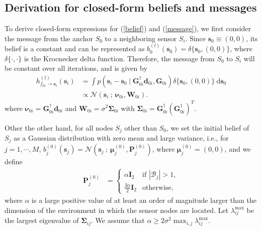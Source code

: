 \documentclass[10pt, twocolumn, final]{IEEEtran}
\newcommand{\bP}{\mathbf{P}}
\newcommand{\bW}{\mathbf{W}}
\newcommand{\bSigma}{\mathbf{\Sigma}}
\newcommand{\N}[2]{{\mathcal{N}\left(#1\ ;\ #2\right)}}
\newcommand{\tc}[1]{^{(#1)}}
\begin{document}
\subsection{Derivation for closed-form beliefs and messages}\label{Subsection:Derivation}
To derive closed-form expressions for (\ref{belief}) and (\ref{message}), we first consider the message from the anchor $S_0$ to a neighboring sensor $S_i$. Since $\mathbf{s}_0 \equiv (0, 0)$, its belief is a constant and can be represented as $b_0^{(l)}(\mathbf{s}_0) = \delta\{\mathbf{s}_0, (0, 0)\}$, where $\delta\{\cdot, \cdot\}$ is the Krocnecker delta function. Therefore, the message from $S_0$ to $S_i$ will be constant over all iterations, and is given by
\begin{align}
h_{f_{0i} \rightarrow \mathbf{s}_i}^{(l)}(\mathbf{s}_i) & = \int p(\mathbf{s}_i - \mathbf{s}_0 \mid \mathbf{G}_{0i}^{\dagger}\mathbf{d}_{0i}, \mathbf{G}_{0i}) \delta\{\mathbf{s}_0, (0,0)\} \ \mathrm{d} \mathbf{s}_0 \nonumber \\
& \propto \N{\mathbf{s}_i}{\bm{\nu}_{0i},\bW_{0i}}. \label{S0Si}
\end{align}
where $\bm{\nu}_{0i} = \mathbf{G}_{0i}^{\dagger}\mathbf{d}_{0i}$ and $\bW_{0i} = \sigma^2\bSigma_{0i}$ with $\bSigma_{0i} = \mathbf{G}_{0i}^{\dagger} (\mathbf{G}_{0i}^{\dagger})^T$.

Other the other hand, for all nodes $S_j$ other than $S_0$, we set the initial belief of $S_j$ as a Gaussian distribution with zero mean and large variance, i.e., for $j = 1, \cdots, M$, $b_j^{(0)}(\mathbf{s}_j) = \N{\mathbf{s}_j}{\bm{\mu}_j\tc{0}, \bP_j\tc{0}}$, where $\bm{\mu}_j\tc{0} = (0,0)$, and we define
\begin{align*}
\bP_j\tc{0} & = \left\{
\begin{array}{rl}
\alpha \mathbf{I}_2 & \text{if } |\mathcal{B}_j| > 1, \\
\frac{3\alpha}{2}\mathbf{I}_2 & \text{otherwise,}
\end{array}
\right.
\end{align*}
where $\alpha$ is a large positive value of at least an order of magnitude larger than the dimension of the environment in which the sensor nodes are located. Let $\lambda_{ij}^{\max}$ be the largest eigenvalue of $\bSigma_{ij}$. We assume that $\alpha \geq 2\sigma^2 \max_{i,j} \lambda_{ij}^{\max}$.
\end{document}
